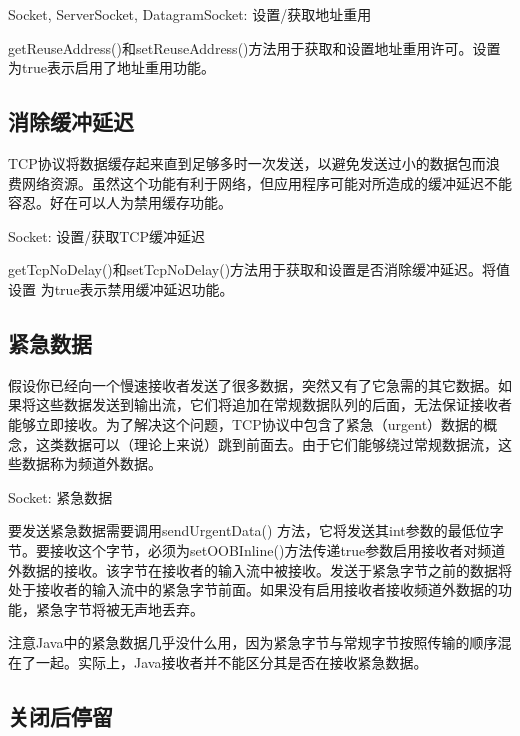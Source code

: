 		Socket, ServerSocket, DatagramSocket: 设置/获取地址重用 

		

		getReuseAddress()和setReuseAddress()方法用于获取和设置地址重用许可。设置为true表示启用了地址重用功能。 

	\subsection{消除缓冲延迟} 

		TCP协议将数据缓存起来直到足够多时一次发送，以避免发送过小的数据包而浪费网络资源。虽然这个功能有利于网络，但应用程序可能对所造成的缓冲延迟不能容忍。好在可以人为禁用缓存功能。 

		Socket: 设置/获取TCP缓冲延迟 

		

		getTcpNoDelay()和setTcpNoDelay()方法用于获取和设置是否消除缓冲延迟。将值设置
		为true表示禁用缓冲延迟功能。 

	\subsection{紧急数据} 

		假设你已经向一个慢速接收者发送了很多数据，突然又有了它急需的其它数据。如果将这些数据发送到输出流，它们将追加在常规数据队列的后面，无法保证接收者能够立即接收。为了解决这个问题，TCP协议中包含了紧急（urgent）数据的概念，这类数据可以（理论上来说）跳到前面去。由于它们能够绕过常规数据流，这些数据称为频道外数据。 

		Socket: 紧急数据 

		

		要发送紧急数据需要调用sendUrgentData() 方法，它将发送其int参数的最低位字节。要接收这个字节，必须为setOOBInline()方法传递true参数启用接收者对频道外数据的接收。该字节在接收者的输入流中被接收。发送于紧急字节之前的数据将处于接收者的输入流中的紧急字节前面。如果没有启用接收者接收频道外数据的功能，紧急字节将被无声地丢弃。 

		注意Java中的紧急数据几乎没什么用，因为紧急字节与常规字节按照传输的顺序混在了一起。实际上，Java接收者并不能区分其是否在接收紧急数据。 

	\subsection{关闭后停留} 

